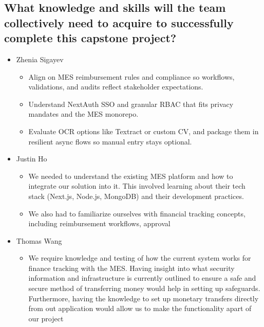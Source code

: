 \documentclass[12pt]{article}
\begin{document}
  \subsection{What knowledge and skills will the team collectively need to acquire to
    successfully complete this capstone project?}
  \begin{itemize}
    \item Zhenia Sigayev
      \begin{itemize}[label=$\circ$]
        \item Align on MES reimbursement rules and compliance so workflows, validations, and audits reflect stakeholder expectations.
        \item Understand NextAuth SSO and granular RBAC that fits privacy mandates and the MES monorepo.
        \item Evaluate OCR options like Textract or custom CV, and package them in resilient async flows so manual entry stays optional.
      \end{itemize}
    \item Justin Ho
      \begin{itemize}[label=$\circ$]
        \item We needed to understand the existing MES platform and how to integrate our solution into it. This involved learning about their tech stack (Next.js, Node.js, MongoDB) and their development practices.
        \item We also had to familiarize ourselves with financial tracking concepts, including reimbursement workflows, approval
      \end{itemize}
    \item Thomas Wang
      \begin{itemize}[label=$\circ$]
        \item We require knowledge and testing of how the current system works for finance tracking with the MES. Having insight into what security information and infrastructure is currently outlined to ensure a safe and secure method of transferring money would help in setting up safeguards. Furthermore, having the knowledge to set up monetary transfers directly from out application would allow us to make the functionality apart of our project
      \end{itemize}

\end{itemize}
\end{document}
